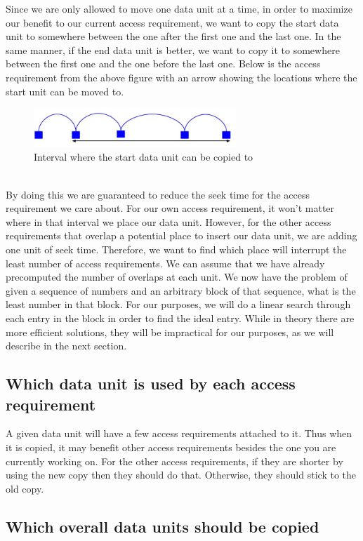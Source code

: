 \documentclass[conference]{acmsiggraph}
\begin{document}
Since we are only allowed to move one data unit at a time, in order to maximize our benefit to our current access requirement, we want to copy the start data unit to somewhere between the one after the first one and the last one. In the same manner, if the end data unit is better, we want to copy it to somewhere between the first one and the one before the last one. Below is the access requirement from the above figure with an arrow showing the locations where the start unit can be moved to. \\
\begin{figure}[ht]
\centering
\includegraphics[width=3in]{SingleAR_afterCopy1.jpg}
\caption{Interval where the start data unit can be copied to}
\end{figure}
\\
By doing this we are guaranteed to reduce the seek time for the access requirement we care about. For our own access requirement, it won't matter where in that interval we place our data unit. However, for the other access requirements that overlap a potential place to insert our data unit, we are adding one unit of seek time. Therefore, we want to find which place will interrupt the least number of access requirements. We can assume that we have already precomputed the number of overlaps at each unit. We now have the problem of given a sequence of numbers and an arbitrary block of that sequence, what is the least number in that block. For our purposes, we will do a linear search through each entry in the block in order to find the ideal entry. While in theory there are more efficient solutions, they will be impractical for our purposes, as we will describe in the next section.

\subsection{Which data unit is used by each access requirement}

A given data unit will have a few access requirements attached to it. Thus when it is copied, it may benefit other access requirements besides the one you are currently working on. For the other access requirements, if they are shorter by using the new copy then they should do that. Otherwise, they should stick to the old copy.

\subsection{Which overall data units should be copied}
\end{document}
